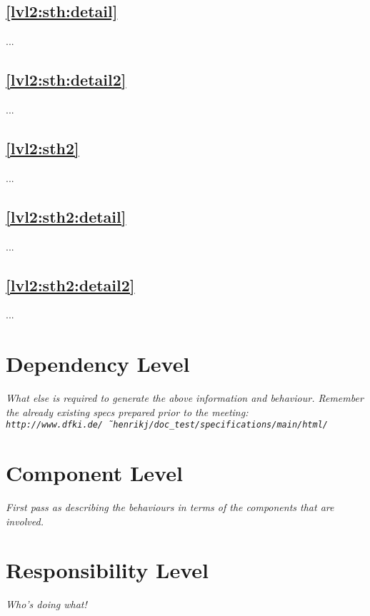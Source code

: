 \documentclass{article}
\begin{document}
\subsection{\ref{lvl2:sth:detail}}
...
\subsection{\ref{lvl2:sth:detail2}}
...
\subsection{\ref{lvl2:sth2}}
...
\subsection{\ref{lvl2:sth2:detail}}
...
\subsection{\ref{lvl2:sth2:detail2}}
...

\section{Dependency Level}

\textit{
  What else is required to generate the above information and
  behaviour. Remember the already existing specs prepared prior to the
  meeting: \texttt{http://www.dfki.de/\~\ henrikj/doc\_test/specifications/main/html/}}


\section{Component Level}

\textit{
  First pass as describing the behaviours in terms of the components
  that are involved.}

\section{Responsibility Level}

\textit{
  Who's doing what!}
\end{document}
